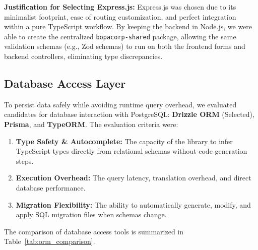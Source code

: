 \documentclass[letterpaper%
, oneside%
, 12pt%
, memoireprojet%
, english%
,creativecommons,hyperref, withAlgo2e %
]{thETS}
\begin{document}
\textbf{Justification for Selecting Express.js:} Express.js was chosen due to its minimalist footprint, ease of routing customization, and perfect integration within a pure TypeScript workflow. By keeping the backend in Node.js, we were able to create the centralized \texttt{bopacorp-shared} package, allowing the same validation schemas (e.g., Zod schemas) to run on both the frontend forms and backend controllers, eliminating type discrepancies.

\subsection{Database Access Layer}
To persist data safely while avoiding runtime query overhead, we evaluated candidates for database interaction with PostgreSQL: \textbf{Drizzle ORM} (Selected), \textbf{Prisma}, and \textbf{TypeORM}. The evaluation criteria were:
\begin{enumerate}
    \item \textbf{Type Safety \& Autocomplete:} The capacity of the library to infer TypeScript types directly from relational schemas without code generation steps.
    \item \textbf{Execution Overhead:} The query latency, translation overhead, and direct database performance.
    \item \textbf{Migration Flexibility:} The ability to automatically generate, modify, and apply SQL migration files when schemas change.
\end{enumerate}

The comparison of database access tools is summarized in Table~\ref{tab:orm_comparison}.
\end{document}
